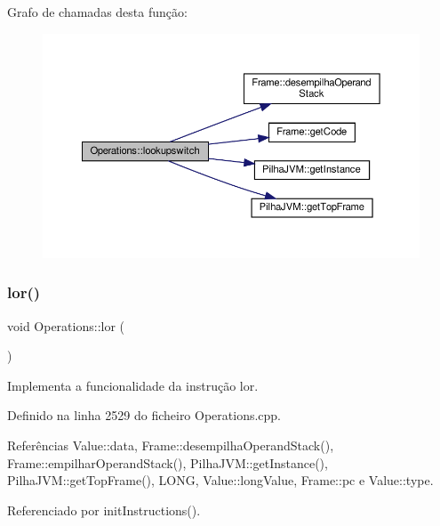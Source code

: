 Grafo de chamadas desta função\+:\nopagebreak
\begin{figure}[H]
\begin{center}
\leavevmode
\includegraphics[width=350pt]{classOperations_a0458ee466daff63a3698973c89cfe71a_cgraph}
\end{center}
\end{figure}
\mbox{\label{classOperations_a89193dfaaa2c4c45f320c6b9f0b5601c}} 
\subsubsection{\texorpdfstring{lor()}{lor()}}
{\footnotesize\ttfamily void Operations\+::lor (\begin{DoxyParamCaption}{ }\end{DoxyParamCaption})\hspace{0.3cm}{\ttfamily [private]}}



Implementa a funcionalidade da instrução lor. 



Definido na linha 2529 do ficheiro Operations.\+cpp.



Referências Value\+::data, Frame\+::desempilha\+Operand\+Stack(), Frame\+::empilhar\+Operand\+Stack(), Pilha\+J\+V\+M\+::get\+Instance(), Pilha\+J\+V\+M\+::get\+Top\+Frame(), L\+O\+NG, Value\+::long\+Value, Frame\+::pc e Value\+::type.



Referenciado por init\+Instructions().

